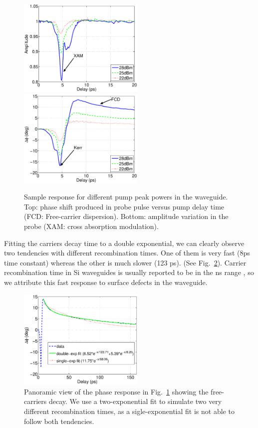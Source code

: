 \documentclass[twocolumn]{el-author}
\begin{document}
\begin{figure}[htb]
    \centering
    \includegraphics[width=60mm]{ntc02amp}
    \includegraphics[width=60mm]{ntc02phase}
    \caption{Sample response for different pump peak powers in the waveguide. Top: phase shift produced in probe pulse versus pump delay time (FCD: Free-carrier dispersion). Bottom: amplitude variation in the probe (XAM: cross absorption modulation).}
    \label{fig:ntc02TimeResSwitching}
\end{figure}

Fitting the carriers decay time to a double exponential, we can clearly observe two tendencies with different recombination times. One of them is very fast (8ps time constant) whereas the other is much slower (123 ps). (See Fig.~\ref{fig:zoomTimeResNtc02Switching}). Carrier recombination time in Si waveguides is usually reported to be in the ns range \cite{Almeida2004b,Xu2007}, so we attribute this fast response to surface defects in the waveguide.

\begin{figure}[htb]
    \centering
    \includegraphics[width=60mm]{ntc02phase_exp_fit}
    \caption{Panoramic view of the phase response in Fig.~\ref{fig:ntc02TimeResSwitching} showing the free-carriers decay. We use a two-exponential fit to simulate two very different recombination times, as a sigle-exponential fit is not able to follow both tendencies.}
    \label{fig:zoomTimeResNtc02Switching}
\end{figure}
\end{document}
